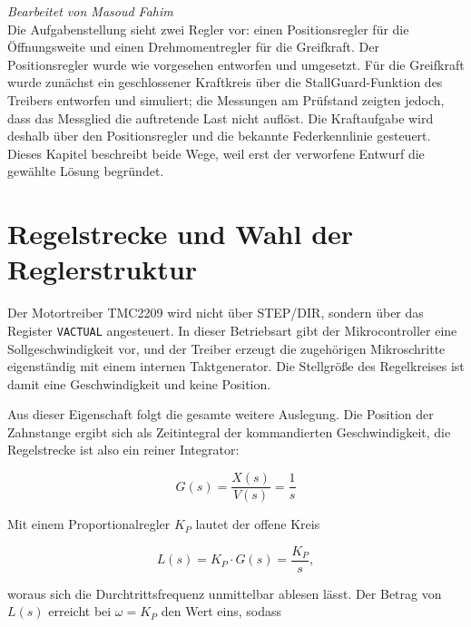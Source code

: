 \textit{Bearbeitet von Masoud Fahim}\\

Die Aufgabenstellung sieht zwei Regler vor: einen Positionsregler für die Öffnungsweite
und einen Drehmomentregler für die Greifkraft. Der Positionsregler wurde wie vorgesehen
entworfen und umgesetzt. Für die Greifkraft wurde zunächst ein geschlossener Kraftkreis
über die StallGuard-Funktion des Treibers entworfen und simuliert; die Messungen am
Prüfstand zeigten jedoch, dass das Messglied die auftretende Last nicht auflöst. Die
Kraftaufgabe wird deshalb über den Positionsregler und die bekannte Federkennlinie
gesteuert. Dieses Kapitel beschreibt beide Wege, weil erst der verworfene Entwurf die
gewählte Lösung begründet.

\section{Regelstrecke und Wahl der Reglerstruktur}
\label{sec:strecke}

Der Motortreiber TMC2209 wird nicht über STEP/DIR, sondern über das Register
\texttt{VACTUAL} angesteuert. In dieser Betriebsart gibt der Mikrocontroller eine
Sollgeschwindigkeit vor, und der Treiber erzeugt die zugehörigen Mikroschritte
eigenständig mit einem internen Taktgenerator. Die Stellgröße des Regelkreises ist damit
eine Geschwindigkeit und keine Position.

Aus dieser Eigenschaft folgt die gesamte weitere Auslegung. Die Position der Zahnstange
ergibt sich als Zeitintegral der kommandierten Geschwindigkeit, die Regelstrecke ist also
ein reiner Integrator:

\begin{equation}
    G(s) = \frac{X(s)}{V(s)} = \frac{1}{s}
    \label{eq:strecke}
\end{equation}

Mit einem Proportionalregler $K_P$ lautet der offene Kreis

\begin{equation}
    L(s) = K_P \cdot G(s) = \frac{K_P}{s} ,
    \label{eq:offenerkreis}
\end{equation}

woraus sich die Durchtrittsfrequenz unmittelbar ablesen lässt. Der Betrag von $L(s)$
erreicht bei $\omega = K_P$ den Wert eins, sodass

